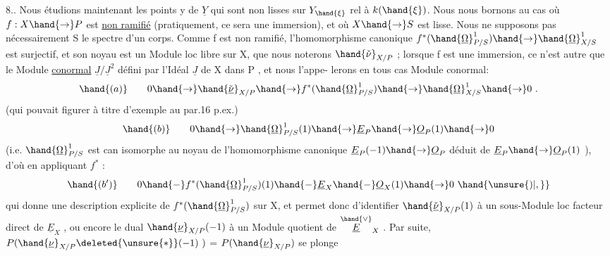 
8.. Nous étudions maintenant les points  y de $\underline{Y}$ qui sont non lisses
sur $Y_{\hand{\xi}}$ rel à $k(\hand{\xi})$. Nous nous  bornons au cas où  $f:X\hand{\to} P$  est \uline{non ramifié}
(pratiquement, ce sera une immersion), et où $X\hand{\to} S$ est lisse.  Nous ne
supposons pas nécessairement S le spectre d'un corps.  
 Comme
f  est non ramifié, l'homomorphisme canonique   $f^*(\hand{\underline{\Omega}}^1_{P/S})\hand{\to}\hand{\underline{\Omega}}^1_{X/S}$
est surjectif, et son noyau est un Module loc libre sur X, que nous
noterons  $\hand{\check{\nu}}_{X/P}$ ; lorsque f est une immersion, ce n'est autre que le
Module \uline{conormal}  $\underline{J}/\underline{J}^2$  défini par l'Idéal $\underline{J}$ de X dans P , et nous l'appe-%
lerons en tous cas Module conormal:
\[ \hand{(a)} \qquad 0\hand{\to}\hand{\check{\underline{\nu}}}_{X/P}\hand{\to} f^*(\hand{\underline{\Omega}}^1_{P/S})\hand{\to}\hand{\underline{\Omega}}^1_{X/S}\hand{\to} 0 \ . \]
\margin{\hand{$|||$}}
(qui pouvait figurer à titre d'exemple au par.16 p.ex.)
\[ \hand{(b)} \qquad 0\hand{\to}\hand{\underline{\Omega}}^1_{P/S}(1)\hand{\to}\underline{E}_P\hand{\to}\underline{O}_P(1)\hand{\to} 0 \]
(i.e. $\hand{\underline{\Omega}}^1_{P/S}$ est can isomorphe au noyau de l'homomorphisme canonique
$\underline{E}_P(-1)\hand{\to}\underline{O}_P$  déduit de $\underline{E}_P\hand{\to}\underline{O}_P(1)$ ), d'où en appliquant $f^*$ :
\[ \hand{(b')} \qquad 0 \hand{-} f^*(\hand{\underline{\Omega}}^1_{P/S})(1) \hand{-} \underline{E}_X \hand{-} \underline{O}_X(1)\hand{\to} 0 \ \hand{\unsure{)|,}} \]
qui donne une description explicite de  $f^*(\hand{\underline{\Omega}}^1_{P/S})$   sur X, et
permet  donc d'identifier $\hand{\check{\underline{\nu}}}_{X/P}(1)$  à un sous-Module loc facteur direct
de $\underline{E}_X$ , ou encore le  dual  $\hand{\underline{\nu}}_{X/P}(-1)$  à un Module
quotient de $\overset{\hand{\vee}}{\underline{E}}_X$ .  Par suite,   $P(\hand{\underline{\nu}}_{X/P}\deleted{\unsure{*}}(-1)\ )$  =  $P(\hand{\underline{\nu}}_{X/P})$  se plonge
